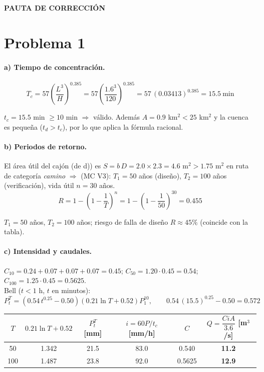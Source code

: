 \documentclass[11pt,letterpaper]{article}
\begin{document}
\newpage
\begin{center}
{\Large\bfseries\color{azulusm} PAUTA DE CORRECCIÓN}
\end{center}

\section*{Problema 1}

\paragraph{a) Tiempo de concentración.}
\[
T_c=57\left(\frac{L^3}{H}\right)^{0.385}=57\left(\frac{1.6^3}{120}\right)^{0.385}=57\,(0.03413)^{0.385}=15.5\ \text{min}
\]
\begin{resp}$t_c=15.5$ min $\ge 10$ min $\Rightarrow$ válido. Además $A=0.9$ km$^2<25$ km$^2$ y la cuenca es
pequeña ($t_d>t_c$), por lo que aplica la fórmula racional.\end{resp}

\paragraph{b) Periodos de retorno.} El área útil del cajón (de d)) es $S=b\,D=2.0\times2.3=4.6$ m$^2>1.75$ m$^2$
en ruta de categoría \emph{camino} $\Rightarrow$ (MC V3): $T_1=50$ años (diseño), $T_2=100$ años (verificación),
vida útil $n=30$ años.
\[
R=1-\left(1-\frac{1}{T}\right)^n=1-\left(1-\frac1{50}\right)^{30}=0.455
\]
\begin{resp}$T_1=50$ años, $T_2=100$ años; riesgo de falla de diseño $R\approx45\%$ (coincide con la tabla).\end{resp}

\paragraph{c) Intensidad y caudales.}
$C_{10}=0.24+0.07+0.07+0.07=0.45$; $C_{50}=1.20\cdot0.45=0.54$; $C_{100}=1.25\cdot0.45=0.5625$.\\
Bell ($t<1$ h, $t$ en minutos):
\[
P_t^T=\left(0.54\,t^{0.25}-0.50\right)\left(0.21\ln T+0.52\right)P_1^{10},\qquad 0.54\,(15.5)^{0.25}-0.50=0.572
\]
\begin{center}
\begin{tabular}{cccccc}
\toprule
$T$ & $0.21\ln T+0.52$ & $P_t^T$ [mm] & $i=60P/t_c$ [mm/h] & $C$ & $Q=\dfrac{CiA}{3.6}$ [m$^3$/s]\\
\midrule
50 & 1.342 & 21.5 & 83.0 & 0.540 & \textbf{11.2}\\
100 & 1.487 & 23.8 & 92.0 & 0.5625 & \textbf{12.9}\\
\bottomrule
\end{tabular}
\end{center}
\end{document}
